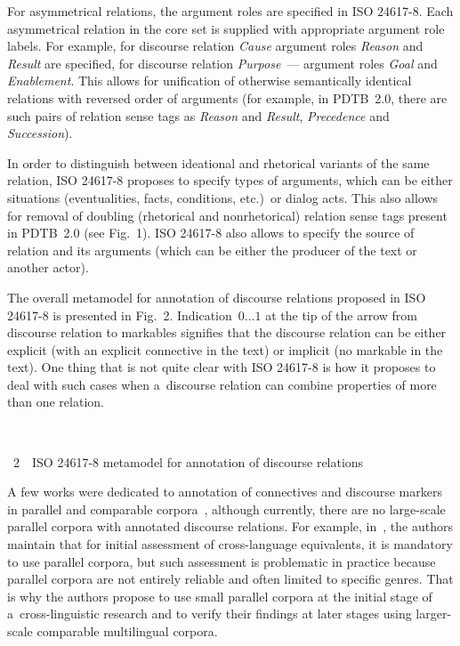 \begin{multicols}{2}
  For asymmetrical relations, the argument roles are specified in ISO 24617-8. Each 
asymmetrical relation in the core set is supplied with appropriate argument role 
labels. For example, for discourse relation \textit{Cause} argument roles 
\textit{Reason} and \textit{Result} are specified, for discourse relation 
\textit{Purpose}~--- argument roles \textit{Goal} and \textit{Enablement}. This 
allows for unification of otherwise semantically identical relations with reversed 
order of arguments (for example, in PDTB~2.0, there are such pairs of relation sense 
tags as \textit{Reason} and \textit{Result}, \textit{Precedence} and 
\textit{Succession}).
  
  In order to distinguish between ideational and rhetorical variants of the same 
relation, ISO 24617-8 proposes to specify types of arguments, which can be either 
situations (eventualities, facts, conditions, etc.)\ or dialog acts. This also allows for 
removal of doubling (rhetorical and nonrhetorical) relation sense tags present in 
PDTB~2.0 (see Fig.~1). ISO 24617-8 also allows to specify the source of relation and 
its arguments (which can be either the producer of the text or another actor).

  
  The overall metamodel for annotation of discourse relations proposed in ISO 
24617-8 is presented in Fig.~2. Indication~$0\ldots1$ at the tip of the arrow from 
discourse relation to markables signifies that the discourse relation
 can be either 
explicit (with an explicit connective in the text) or implicit (no markable in the text). 
One thing that is not quite clear with ISO 24617-8 is how it proposes to deal with 
such cases when a~discourse relation can combine properties of more than one 
relation.
  
  
   { \begin{center}  %
 \vspace*{16pt}
 \mbox{%
 \epsfxsize=75.108mm 
 }


\end{center}


\noindent
{{\figurename~2}\ \ \small{ISO 24617-8 metamodel for annotation of discourse relations}}
}


\addtocounter{figure}{1}
 
  
  A few works were dedicated to annotation of connectives and discourse markers in 
parallel and comparable corpora~\cite{11-kr, 12-kr}, although currently, there are no 
large-scale parallel corpora with annotated discourse relations. For example, 
in~\cite[p.~4--5]{11-kr},  the authors maintain that for initial assessment of  
cross-language equivalents, it is mandatory to use parallel corpora, but such 
assessment is problematic in practice because parallel corpora are not entirely reliable 
and often limited to specific genres. That is why the authors propose to use small 
parallel corpora at the initial stage of a~cross-linguistic research and to verify their 
findings at later stages using larger-scale comparable multilingual corpora.


\end{multicols}

